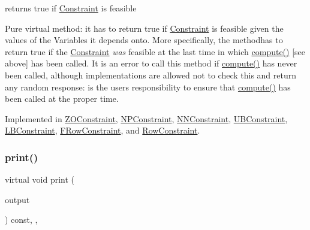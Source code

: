 returns true if \mbox{\hyperlink{class_s_m_spp__di__unipi__it_1_1_constraint}{Constraint}} is feasible 

Pure virtual method\+: it has to return true if \mbox{\hyperlink{class_s_m_spp__di__unipi__it_1_1_constraint}{Constraint}} is feasible given the values of the Variables it depends onto. More specifically, the methodhas to return true if the \mbox{\hyperlink{class_s_m_spp__di__unipi__it_1_1_constraint}{Constraint}} {\itshape was} feasible at the last time in which \mbox{\hyperlink{class_s_m_spp__di__unipi__it_1_1_constraint_a504d4e3e174c7a518cc66156a8a45ce5}{compute()}} \mbox{[}see above\mbox{]} has been called. It is an error to call this method if \mbox{\hyperlink{class_s_m_spp__di__unipi__it_1_1_constraint_a504d4e3e174c7a518cc66156a8a45ce5}{compute()}} has never been called, although implementations are allowed not to check this and return any random response\+: is the users\textquotesingle{} responsibility to ensure that \mbox{\hyperlink{class_s_m_spp__di__unipi__it_1_1_constraint_a504d4e3e174c7a518cc66156a8a45ce5}{compute()}} has been called at the proper time. 

Implemented in \mbox{\hyperlink{class_s_m_spp__di__unipi__it_1_1_z_o_constraint_a575ce9dd82d423f5d6e9699622935415}{Z\+O\+Constraint}}, \mbox{\hyperlink{class_s_m_spp__di__unipi__it_1_1_n_p_constraint_a575ce9dd82d423f5d6e9699622935415}{N\+P\+Constraint}}, \mbox{\hyperlink{class_s_m_spp__di__unipi__it_1_1_n_n_constraint_a575ce9dd82d423f5d6e9699622935415}{N\+N\+Constraint}}, \mbox{\hyperlink{class_s_m_spp__di__unipi__it_1_1_u_b_constraint_a575ce9dd82d423f5d6e9699622935415}{U\+B\+Constraint}}, \mbox{\hyperlink{class_s_m_spp__di__unipi__it_1_1_l_b_constraint_a575ce9dd82d423f5d6e9699622935415}{L\+B\+Constraint}}, \mbox{\hyperlink{class_s_m_spp__di__unipi__it_1_1_f_row_constraint_a508a569b1ce65668a4bbe261b0e2efab}{F\+Row\+Constraint}}, and \mbox{\hyperlink{class_s_m_spp__di__unipi__it_1_1_row_constraint_a508a569b1ce65668a4bbe261b0e2efab}{Row\+Constraint}}.

\mbox{\label{class_s_m_spp__di__unipi__it_1_1_constraint_a2e7b9c9148a98c5c342e8c25cac95926}} 
\subsubsection{\texorpdfstring{print()}{print()}}
{\footnotesize\ttfamily virtual void print (\begin{DoxyParamCaption}\item[{std\+::ostream \&}]{output }\end{DoxyParamCaption}) const\hspace{0.3cm}{\ttfamily [inline]}, {\ttfamily [protected]}, {\ttfamily [virtual]}}



